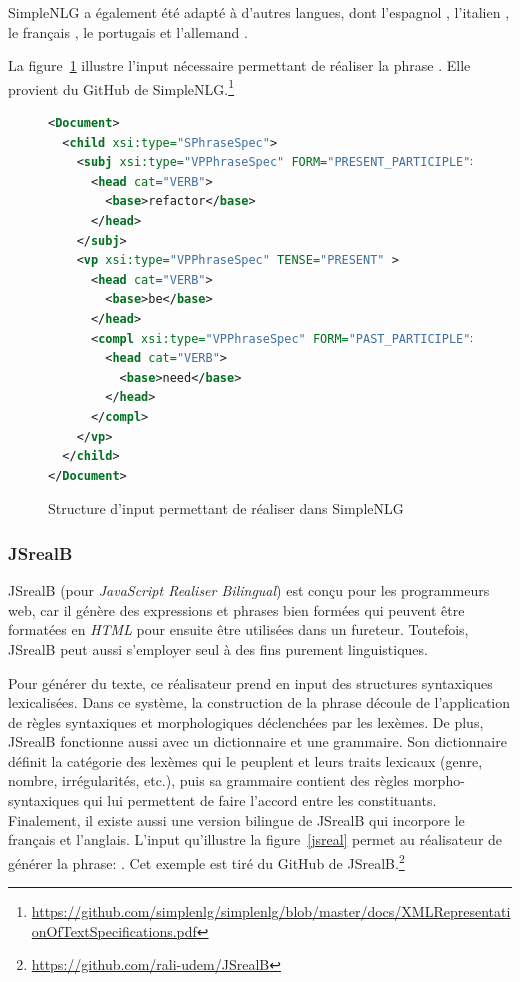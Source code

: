 SimpleNLG a également été adapté à d'autres langues, dont l'espagnol \citep{RamosSotoAdaptingSimpleNLGSpanish2017}, l'italien \citep{MazzeiSimpleNLGITadaptingSimpleNLG2016}, le français \citep{VaudryAdaptingSimpleNLGBilingual2013}, le portugais \citep{deOliveiraAdaptingSimpleNLGBrazilian2014} et l'allemand \citep{BollmannAdaptingSimpleNLGGerman2011}.

La figure~\ref{simplenlg} illustre l'input nécessaire permettant de réaliser la phrase . Elle provient du GitHub de SimpleNLG.\footnote{\url{https://github.com/simplenlg/simplenlg/blob/master/docs/XMLRepresentationOfTextSpecifications.pdf}}

\begin{figure}[htb]
\begin{lstlisting}[language=Xml]
<Document>
  <child xsi:type="SPhraseSpec">
    <subj xsi:type="VPPhraseSpec" FORM="PRESENT_PARTICIPLE">
      <head cat="VERB">
        <base>refactor</base>
      </head>
    </subj>
    <vp xsi:type="VPPhraseSpec" TENSE="PRESENT" >
      <head cat="VERB">
        <base>be</base>
      </head>
      <compl xsi:type="VPPhraseSpec" FORM="PAST_PARTICIPLE">
        <head cat="VERB">
          <base>need</base>
        </head>
      </compl>
    </vp>
  </child>
</Document>
\end{lstlisting}
 \caption{Structure d'input permettant de réaliser  dans SimpleNLG}
 \label{simplenlg}
\end{figure}

\subsubsection{JSrealB}
JSrealB (pour \emph{JavaScript Realiser Bilingual}) \citep{DBLP:conf/enlg/MolinsL15} est conçu pour les programmeurs web, car il génère des expressions et phrases bien formées qui peuvent être formatées en \emph{HTML} pour ensuite être utilisées dans un fureteur. Toutefois, JSrealB peut aussi s'employer seul à des fins purement linguistiques.

Pour générer du texte, ce réalisateur prend en input des structures syntaxiques lexicalisées. Dans ce système, la construction de la phrase découle de l'application de règles syntaxiques et morphologiques déclenchées par les lexèmes. De plus, JSrealB fonctionne aussi avec un dictionnaire et une grammaire. Son dictionnaire définit la catégorie des lexèmes qui le peuplent et leurs traits lexicaux (genre, nombre, irrégularités, etc.), puis sa grammaire contient des règles morpho-syntaxiques qui lui permettent de faire l'accord entre les constituants. Finalement, il existe aussi une version bilingue de JSrealB \citep{MolinsJSrealBBilingualText2015} qui incorpore le français et l'anglais. L'input qu'illustre la figure~\ref{jsreal} permet au réalisateur de générer la phrase: . Cet exemple est tiré du GitHub de JSrealB.\footnote{\url{https://github.com/rali-udem/JSrealB}}

